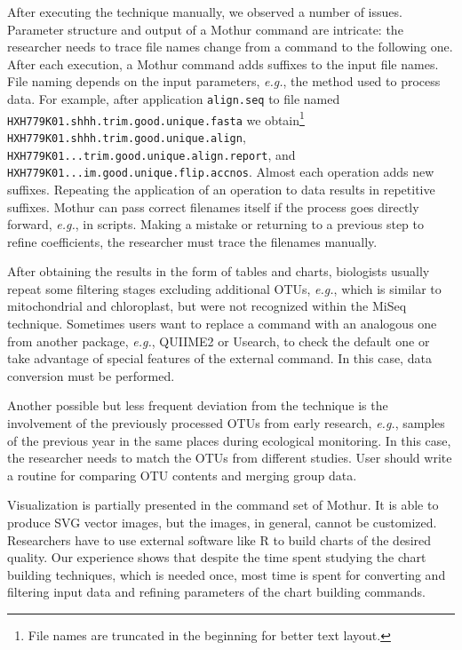 \documentclass[a4paper]{jpconf}
\begin{document}

After executing the technique manually, we observed a number of issues. Parameter structure and output of a Mothur command are intricate: the researcher needs to trace file names change from a command to the following one.  After each execution, a Mothur command adds suffixes to the input file names.  File naming depends on the input parameters, \emph{e.g.}, the method used to process data. For example, after application \verb|align.seq| to file named \verb|HXH779K01.shhh.trim.good.unique.fasta| we obtain\footnote{File names are truncated in the beginning for better text layout.} \verb|HXH779K01.shhh.trim.good.unique.align|, \verb|HXH779K01...trim.good.unique.align.report|, and \verb|HXH779K01...im.good.unique.flip.accnos|.  Almost each operation adds new suffixes.  Repeating the application of an operation to data results in repetitive suffixes.  Mothur can pass correct filenames itself if the process goes directly forward, \emph{e.g.}, in scripts.  Making a mistake or returning to a previous step to refine coefficients, the researcher must trace the filenames manually.

After obtaining the results in the form of tables and charts, biologists usually repeat some filtering stages excluding additional OTUs, \emph{e.g.}, which is similar to mitochondrial and chloroplast, but were not recognized within the MiSeq technique.
Sometimes users want to replace a command with an analogous one from another package, \emph{e.g.}, QUIIME2 or Usearch, to check the default one or take advantage of special features of the external command. In this case, data conversion must be performed.

Another possible but less frequent deviation from the technique is the involvement of the previously processed OTUs from early research, \emph{e.g.}, samples of the previous year in the same places during ecological monitoring. In this case, the researcher needs to match the OTUs from different studies. User should write a routine for comparing OTU contents and merging group data.

Visualization is partially presented in the command set of Mothur.  It is able to produce SVG vector images, but the images, in general, cannot be customized.  Researchers have to use external software like R to build charts of the desired quality.  Our experience shows that despite the time spent studying the chart building techniques, which is needed once, most time is spent for converting and filtering input data and refining parameters of the chart building commands.
\end{document}
